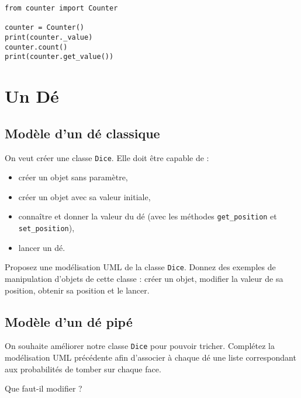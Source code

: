 \documentclass[12pt]{article}
\begin{document}
\lstset{language=Python}
\begin{lstlisting}
from counter import Counter

counter = Counter()
print(counter._value)
counter.count()
print(counter.get_value())
\end{lstlisting}

\section{Un Dé}

\subsection{Modèle d'un dé classique}

On veut créer une classe \verb|Dice|. Elle doit être capable de :
\begin{itemize}
	\item créer un objet sans paramètre,
	\item créer un objet avec sa valeur initiale,
	\item connaître et donner la valeur du dé (avec les méthodes \verb|get_position| et \verb|set_position|),
	\item lancer un dé.
\end{itemize}

Proposez une modélisation UML de la classe \verb|Dice|. Donnez des exemples de manipulation d'objets de cette classe :
créer un objet, modifier la valeur de sa position, obtenir sa position et le lancer.

\subsection{Modèle d'un dé pipé}

On souhaite améliorer notre classe \verb|Dice| pour pouvoir tricher. Complétez la modélisation UML précédente afin
d'associer à chaque dé une liste correspondant aux probabilités de tomber sur chaque face.

Que faut-il modifier ?
\end{document}
